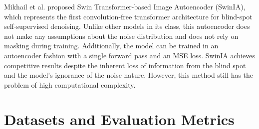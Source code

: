 \documentclass[conference]{IEEEtran}
\begin{document}
Mikhail et al. \cite{papkov2023swinia} proposed Swin Transformer-based Image Autoencoder (SwinIA), which represents the first convolution-free transformer architecture for blind-spot self-supervised denoising. Unlike other models in its class, this autoencoder does not make any assumptions about the noise distribution and does not rely on masking during training. Additionally, the model can be trained in an autoencoder fashion with a single forward pass and an MSE loss. SwinIA achieves competitive results despite the inherent loss of information from the blind spot and the model's ignorance of the noise nature. However, this method still has the problem of high computational complexity.

\section{Datasets and Evaluation Metrics}
\label{sec:Section3}
\end{document}
